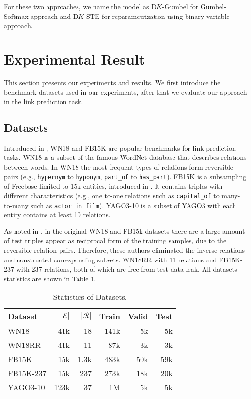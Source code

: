 \documentclass[11pt,a4paper]{article}
\begin{document}
For these two approaches, we name the model as D$K$-Gumbel for Gumbel-Softmax approach and D$K$-STE for reparametrization using binary variable approach.








 \section{Experimental Result} \label{sec: experiment}
This section presents our experiments and results.
We first introduce the benchmark datasets used in our experiments, after that we evaluate our approach in the link prediction task. 

\subsection{Datasets} \label{subsec:datasets}



Introduced in \citet{transe}, WN18 and FB15K are popular benchmarks for link prediction tasks. WN18 is a subset of the famous WordNet database that describes relations between words. In WN18 the most frequent types of relations form reversible pairs (e.g., \verb|hypernym| to \verb|hyponym|, \verb|part_of| to \verb|has_part|). FB15K is a subsampling of Freebase limited to 15k entities, introduced in \citet{transe}. It contains triples with different characteristics (e.g., one to-one relations such as \verb|capital_of| to many-to-many such as \verb|actor_in_film|). YAGO3-10 \cite{convE} is a subset of YAGO3 \cite{yago} with each entity contains at least 10 relations. 



As noted in \citet{fb237, convE}, in the original WN18 and FB15k datasets there are a large amount of test triples appear as reciprocal form of the training samples, due to the reversible relation pairs. Therefore, these authors eliminated the inverse relations and constructed corresponding subsets: WN18RR with 11 relations and FB15K-237 with 237 relations, both of which are free from test data leak. All datasets statistics are shown in Table \ref{tab:data_stats}.

\begin{table}[h]
    \centering
    \small
        \begin{tabularx}{0.44\textwidth}{l|rrrrr} 
        \hline
        Dataset & $|\mathcal{E}|$ & $|\mathcal{R}|$ & Train & Valid & Test \\
        \hline
        WN18 & 41k & 18 &  141k & 5k  &  5k \\ 
        WN18RR & 41k & 11 & 87k  &  3k  &  3k \\
        FB15K & 15k & 1.3k &  483k  &  50k & 59k \\ 
        FB15K-237 & 15k & 237 & 273k & 18k & 20k \\ 
        YAGO3-10 & 123k & 37 & 1M  &  5k  &  5k \\ 
\hline
        \end{tabularx}
    \caption{Statistics of Datasets.}
    \label{tab:data_stats}
\end{table}
\end{document}
